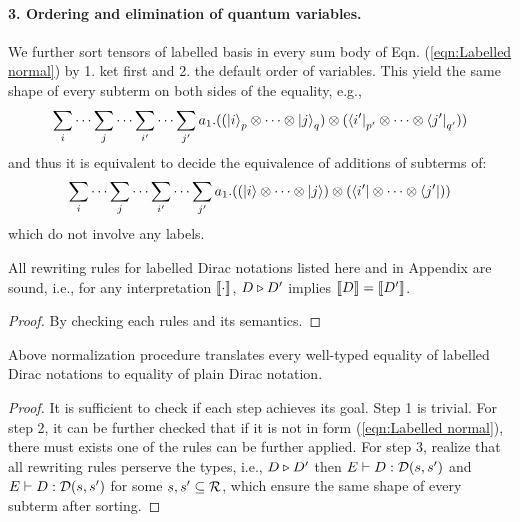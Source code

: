 \paragraph*{3. Ordering and elimination of quantum variables.} 
We further sort tensors of labelled basis in every sum body of Eqn. (\ref{eqn:Labelled normal}) by 1. ket first and 2. the default order of variables. This yield the same shape of every subterm on both sides of the equality, e.g., 
\begin{equation*}
  \sum_{i}\cdots\sum_{j}\cdots \sum_{i'}\cdots\sum_{j'} a_1 . ((\ket{i}_p \otimes \cdots \otimes \ket{j}_q) \otimes (\bra{i'}_{p'}\otimes\cdots\otimes \bra{j'}_{q'}))
\end{equation*}
and thus it is equivalent to decide the equivalence of additions of subterms of:
\begin{equation}
  \label{eqn:Labelled normal1}
  \sum_{i}\cdots\sum_{j}\cdots \sum_{i'}\cdots\sum_{j'} a_1 . ((\ket{i} \otimes \cdots \otimes \ket{j}) \otimes (\bra{i'}\otimes\cdots\otimes \bra{j'}))
\end{equation}
which do not involve any labels.

\begin{theorem}[Soundness]
  All rewriting rules for labelled Dirac notations listed here and in Appendix are sound, i.e., for any interpretation ${\llbracket \cdot \rrbracket}$, $D\triangleright D'$ implies ${\llbracket D \rrbracket} = {\llbracket D' \rrbracket}$.
\end{theorem}
\begin{proof}
  By checking each rules and its semantics.
\end{proof}

\begin{theorem}
  Above normalization procedure translates every well-typed equality of labelled Dirac notations to equality of plain Dirac notation.
\end{theorem}
\begin{proof}
  It is sufficient to check if each step achieves its goal. Step 1 is trivial. For step 2, it can be further checked that if it is not in form (\ref{eqn:Labelled normal}), there must exists one of the rules can be further applied.
  For step 3, realize that all rewriting rules perserve the types, i.e., $D\triangleright D'$ then $E\vdash D : {\mathcal{D}}(s,s')$ and $E\vdash D : {\mathcal{D}}(s,s')$ for some $s,s'\subseteq \mathcal{R}$, which ensure the same shape of every subterm after sorting. 
\end{proof}

